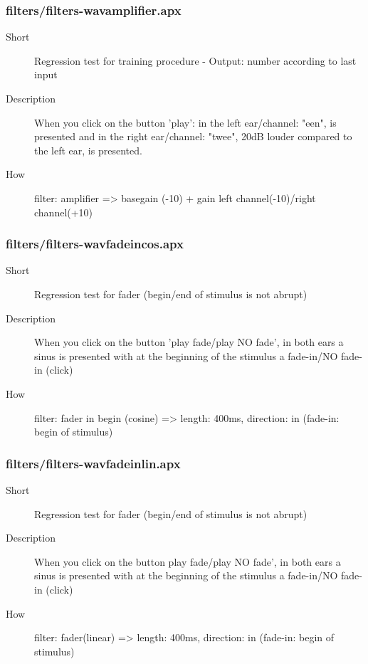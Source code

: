 \subsubsection{filters/filters-wavamplifier.apx}
\begin{description}
\item[Short] 
 Regression test for training procedure - Output: number according to last input
\item[Description] 
 When you click on the button 'play': in the left ear/channel: "een", is presented and in the right ear/channel: "twee", 20dB louder compared to the left ear, is presented.
\item[How] 
 filter: amplifier =\textgreater{} basegain (-10) + gain left channel(-10)/right channel(+10)
\end{description}

\subsubsection{filters/filters-wavfadeincos.apx}
\begin{description}
\item[Short] 
 Regression test for fader (begin/end of stimulus is not abrupt)
\item[Description] 
 When you click on the button 'play fade/play NO fade', in both ears a sinus is presented with at the beginning of the stimulus a fade-in/NO fade-in (click)
\item[How] 
 filter: fader in begin (cosine) =\textgreater{} length: 400ms, direction: in (fade-in: begin of stimulus)
\end{description}

\subsubsection{filters/filters-wavfadeinlin.apx}
\begin{description}
\item[Short] 
 Regression test for fader (begin/end of stimulus is not abrupt)
\item[Description] 
 When you click on the button play fade/play NO fade', in both ears a sinus is presented with at the beginning of the stimulus a fade-in/NO fade-in (click)
\item[How] 
 filter: fader(linear) =\textgreater{} length: 400ms, direction: in (fade-in: begin of stimulus)
\end{description}

